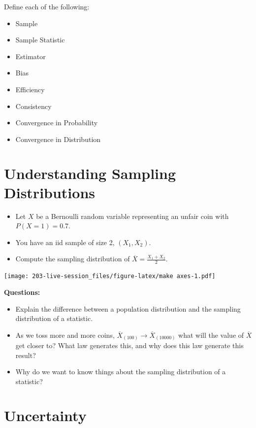 \documentclass[
]{book}
\providecommand{\tightlist}{%
  \setlength{\itemsep}{0pt}\setlength{\parskip}{0pt}}
\theoremstyle{definition}
\theoremstyle{definition}
\theoremstyle{definition}
\theoremstyle{definition}
\theoremstyle{remark}
\begin{document}
Define each of the following:

\begin{itemize}
\tightlist
\item
  Sample
\item
  Sample Statistic
\item
  Estimator
\item
  Bias
\item
  Efficiency
\item
  Consistency
\item
  Convergence in Probability
\item
  Convergence in Distribution
\end{itemize}

\hypertarget{understanding-sampling-distributions}{%
\section{Understanding Sampling Distributions}\label{understanding-sampling-distributions}}

\begin{itemize}
\tightlist
\item
  Let \(X\) be a Bernoulli random variable representing an unfair coin with \(P(X=1) = 0.7\).
\item
  You have an iid sample of size 2, \((X_1,X_2)\).
\item
  Compute the sampling distribution of \(\overline X = \frac{X_1+X_2}{2}\).
\end{itemize}

\texttt{[image: 203-live-session\_files/figure-latex/make axes-1.pdf]}

\textbf{Questions:}

\begin{itemize}
\tightlist
\item
  Explain the difference between a population distribution and the sampling distribution of a statistic.
\item
  As we toss more and more coins, \(\overline X_{(100)} \rightarrow \overline X_{(10000)}\) what will the value of \(\overline X\) get closer to? What law generates this, and why does this law generate this result?
\item
  Why do we want to know things about the sampling distribution of a statistic?
\end{itemize}

\hypertarget{uncertainty}{%
\section{Uncertainty}\label{uncertainty}}
\end{document}
